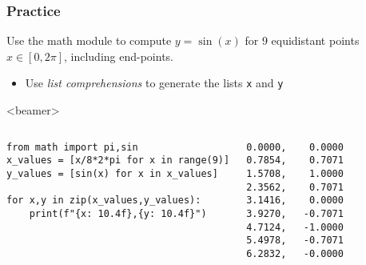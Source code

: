 \begin{frame}[fragile,label=practice_math_module]
  \frametitle{Practice}
  Use the math module to compute $y=\sin(x)$ for 9 equidistant points $x\in \left[0,2\pi\right]$, including end-points.
    \begin{itemize}
      \item Use \emph{list comprehensions} to generate the lists \lstinline|x| and \lstinline|y|
    \end{itemize}\pause
    \begin{onlyenv}<beamer>
      \begin{columns}[T]
        \begin{lstlisting}[]
from math import pi,sin
x_values = [x/8*2*pi for x in range(9)]
y_values = [sin(x) for x in x_values]

for x,y in zip(x_values,y_values):
    print(f"{x: 10.4f},{y: 10.4f}")
        \end{lstlisting}\pause
      \begin{lstlisting}[style=PyOutput]
0.0000,    0.0000
0.7854,    0.7071
1.5708,    1.0000
2.3562,    0.7071
3.1416,    0.0000
3.9270,   -0.7071
4.7124,   -1.0000
5.4978,   -0.7071
6.2832,   -0.0000
      \end{lstlisting}
      \end{columns}
      
    \end{onlyenv}
\end{frame}



